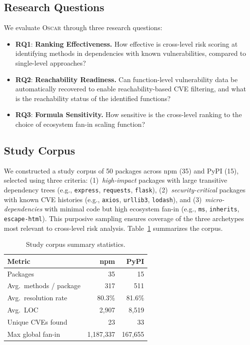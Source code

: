 \documentclass[conference]{IEEEtran}
\newcommand{\rqone}{\textbf{RQ1}}
\newcommand{\rqtwo}{\textbf{RQ2}}
\newcommand{\rqthree}{\textbf{RQ3}}
\begin{document}
\subsection{Research Questions}
\label{subsec:rqs}

We evaluate \textsc{Oscar} through three research questions:

\begin{itemize}
    \item \rqone: \textbf{Ranking Effectiveness.} How effective is cross-level risk scoring at identifying methods in dependencies with known vulnerabilities, compared to single-level approaches?
    
    \item \rqtwo: \textbf{Reachability Readiness.} Can function-level vulnerability data be automatically recovered to enable reachability-based CVE filtering, and what is the reachability status of the identified functions?
    
    \item \rqthree: \textbf{Formula Sensitivity.} How sensitive is the cross-level ranking to the choice of ecosystem fan-in scaling function?
\end{itemize}

\subsection{Study Corpus}
\label{subsec:corpus}

We constructed a study corpus of 50 packages across npm (35) and PyPI (15), selected using three criteria: (1)~\emph{high-impact} packages with large transitive dependency trees (e.g., \texttt{express}, \texttt{requests}, \texttt{flask}), (2)~\emph{security-critical} packages with known CVE histories (e.g., \texttt{axios}, \texttt{urllib3}, \texttt{lodash}), and (3)~\emph{micro-dependencies} with minimal code but high ecosystem fan-in (e.g., \texttt{ms}, \texttt{inherits}, \texttt{escape-html}). This purposive sampling ensures coverage of the three archetypes most relevant to cross-level risk analysis. Table~\ref{tab:corpus-summary} summarizes the corpus.

\begin{table}[t]
    \centering
    \caption{Study corpus summary statistics.}
    \label{tab:corpus-summary}
    \begin{tabular}{lrr}
        \toprule
        \textbf{Metric} & \textbf{npm} & \textbf{PyPI} \\
        \midrule
        Packages & 35 & 15 \\
        Avg.\ methods / package & 317 & 511 \\
        Avg.\ resolution rate & 80.3\% & 81.6\% \\
        Avg.\ LOC & 2{,}907 & 8{,}519 \\
        Unique CVEs found & 23 & 33 \\
        Max global fan-in & 1{,}187{,}337 & 167{,}655 \\
        \bottomrule
    \end{tabular}
\end{table}
\end{document}

